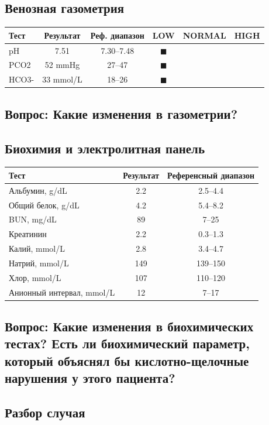 \documentclass[a4paper,12pt]{book}
\begin{document}
\subsection*{Венозная газометрия}
\begin{tabular}{lccccc}
\toprule
Тест & Результат & Реф. диапазон & LOW & NORMAL & HIGH \\
\midrule
pH & 7.51 & 7.30--7.48 & $\blacksquare$ \\
PCO2 & 52 mmHg & 27--47 & $\blacksquare$ \\
HCO3- & 33 mmol/L & 18--26 & $\blacksquare$ \\
\bottomrule
\end{tabular}

\subsection*{Вопрос: Какие изменения в газометрии?}

\subsection*{Биохимия и электролитная панель}
\begin{tabular}{lcc}
\toprule
Тест & Результат & Референсный диапазон \\
\midrule
Альбумин, g/dL & 2.2 & 2.5--4.4 \\
Общий белок, g/dL & 4.2 & 5.4--8.2 \\
BUN, mg/dL & 89 & 7--25 \\
Креатинин & 2.2 & 0.3--1.3 \\
Калий, mmol/L & 2.8 & 3.4--4.7 \\
Натрий, mmol/L & 149 & 139--150 \\
Хлор, mmol/L & 107 & 110--120 \\
Анионный интервал, mmol/L & 12 & 7--17 \\
\bottomrule
\end{tabular}

\subsection*{Вопрос: Какие изменения в биохимических тестах? Есть ли биохимический параметр, который объяснял бы кислотно-щелочные нарушения у этого пациента?}

\subsection*{Разбор случая}
\end{document}
